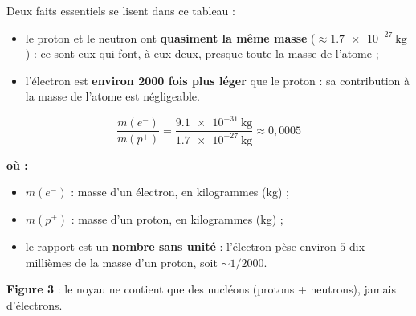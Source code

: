 \documentclass[11pt,a4paper]{article}
\newenvironment{ou}{%
  \par\smallskip\noindent\textbf{où :}\nopagebreak
  \begin{itemize}[leftmargin=1.8em,topsep=2pt,itemsep=1.5pt,parsep=0pt]}%
  {\end{itemize}}
\newcommand{\pp}{p^{+}}      %
\newcommand{\ee}{e^{-}}      %
\newcommand{\nz}{n^{0}}      %
\begin{document}
Deux faits essentiels se lisent dans ce tableau :
\begin{itemize}[leftmargin=1.6em,topsep=2pt,itemsep=1pt]
  \item le proton et le neutron ont \textbf{quasiment la même masse} ($\approx \SI{1,7e-27}{\kilo\gram}$) :
        ce sont eux qui font, à eux deux, presque toute la masse de l'atome ;
  \item l'électron est \textbf{environ 2000 fois plus léger} que le proton : sa contribution à la masse
        de l'atome est négligeable.
\end{itemize}

\begin{formule}
\[ \boxed{\ \dfrac{m(\ee)}{m(\pp)} = \dfrac{\SI{9,1e-31}{\kilo\gram}}{\SI{1,7e-27}{\kilo\gram}} \approx 0{,}0005\ } \]
\begin{ou}
  \item $m(\ee)$ : masse d'un électron, en kilogrammes (\si{\kilo\gram}) ;
  \item $m(\pp)$ : masse d'un proton, en kilogrammes (\si{\kilo\gram}) ;
  \item le rapport est un \textbf{nombre sans unité} : l'électron pèse environ $5$ dix-millièmes de la
        masse d'un proton, soit $\sim 1/2000$.
\end{ou}
\end{formule}

\begin{center}
\end{center}
\vspace{-0.3em}
\begin{center}\small\textbf{\textcolor{primary}{Figure 3}} : le noyau ne contient que des nucléons (protons + neutrons), jamais d'électrons.\end{center}
\end{document}
